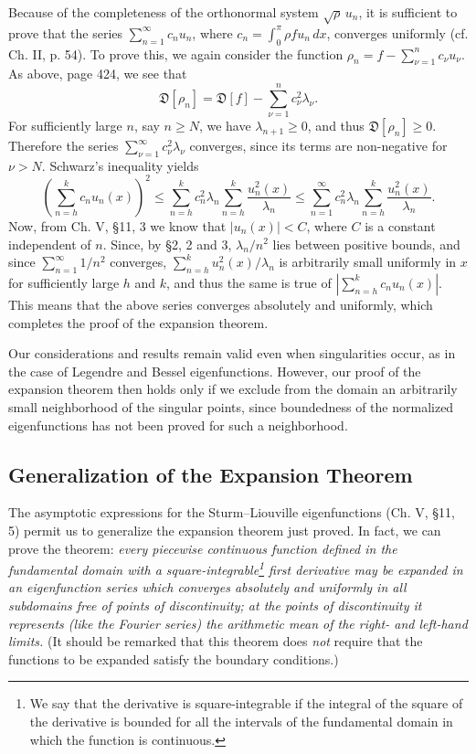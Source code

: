 Because of the completeness of the orthonormal system $\sqrt\rho\,u_n$, it is sufficient to prove that the series $\sum_{n=1}^\infty c_nu_n$, where $c_n=\int_0^\pi\rho f u_n\,dx$, converges uniformly (cf. Ch. II, p. 54). To prove this, we again consider the function $\rho_n=f-\sum_{\nu=1}^n c_\nu u_\nu$. As above, page 424, we see that
\[
\mathfrak D[\rho_n]=\mathfrak D[f]-\sum_{\nu=1}^n c_\nu^2\lambda_\nu.
\]
For sufficiently large $n$, say $n\ge N$, we have $\lambda_{n+1}\ge0$, and thus $\mathfrak D[\rho_n]\ge0$. Therefore the series $\sum_{\nu=1}^\infty c_\nu^2\lambda_\nu$ converges, since its terms are non-negative for $\nu>N$. Schwarz's inequality yields
\[
\left(\sum_{n=h}^k c_nu_n(x)\right)^2
\le\sum_{n=h}^k c_n^2\lambda_n\sum_{n=h}^k\frac{u_n^2(x)}{\lambda_n}
\le\sum_{n=1}^\infty c_n^2\lambda_n\sum_{n=h}^k\frac{u_n^2(x)}{\lambda_n}.
\]
Now, from Ch. V, \S11, 3 we know that $|u_n(x)|<C$, where $C$ is a constant independent of $n$. Since, by \S2, 2 and 3, $\lambda_n/n^2$ lies between positive bounds, and since $\sum_{n=1}^\infty1/n^2$ converges, $\sum_{n=h}^k u_n^2(x)/\lambda_n$ is arbitrarily small uniformly in $x$ for sufficiently large $h$ and $k$, and thus the same is true of $|\sum_{n=h}^k c_nu_n(x)|$. This means that the above series converges absolutely and uniformly, which completes the proof of the expansion theorem.

Our considerations and results remain valid even when singularities occur, as in the case of Legendre and Bessel eigenfunctions. However, our proof of the expansion theorem then holds only if we exclude from the domain an arbitrarily small neighborhood of the singular points, since boundedness of the normalized eigenfunctions has not been proved for such a neighborhood.

\subsection{Generalization of the Expansion Theorem}
The asymptotic expressions for the Sturm--Liouville eigenfunctions (Ch. V, \S11, 5) permit us to generalize the expansion theorem just proved. In fact, we can prove the theorem: \emph{every piecewise continuous function defined in the fundamental domain with a square-integrable\footnote{We say that the derivative is square-integrable if the integral of the square of the derivative is bounded for all the intervals of the fundamental domain in which the function is continuous.} first derivative may be expanded in an eigenfunction series which converges absolutely and uniformly in all subdomains free of points of discontinuity; at the points of discontinuity it represents (like the Fourier series) the arithmetic mean of the right- and left-hand limits.} (It should be remarked that this theorem does \emph{not} require that the functions to be expanded satisfy the boundary conditions.)

